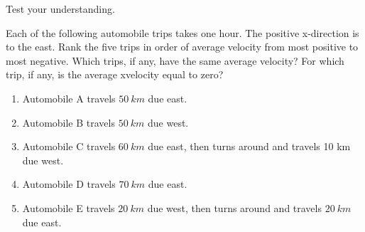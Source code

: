 \documentclass[]{beamer}
\begin{document}
\begin{frame}
Test your understanding.

\vspace{3mm}

Each of the following automobile trips takes one hour.
The positive x-direction is to the east.  Rank the five trips in order of average velocity from most positive to most negative. 
  Which trips, if any, have the same average velocity? 
  For which trip, if any, is the average xvelocity equal to zero?

 
\begin{enumerate}
\item   Automobile A travels $50~km$ due east. 
\item  Automobile B travels $50~km$ due west. 
\item  Automobile C travels $60~km$ due east, then turns around and travels 10 km due west. 
\item  Automobile D travels $70~km$ due east. 
\item  Automobile E travels $20~km$ due west, then turns
around and travels $20~km$ due east. 

\end{enumerate}


 \end{frame}

\end{document}
